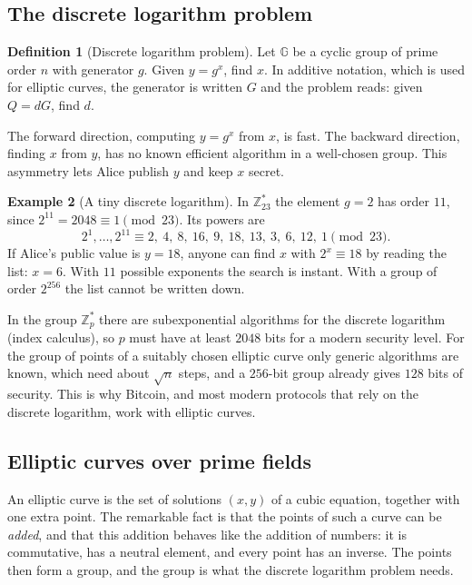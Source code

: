 \documentclass[11pt,a4paper]{article}
\theoremstyle{definition}
\newtheorem{definition}{Definition}[section]
\newtheorem{example}[definition]{Example}
\newcommand{\Z}{\mathbb{Z}}
\begin{document}
\subsection{The discrete logarithm problem}

\begin{definition}[Discrete logarithm problem]
Let $\mathbb{G}$ be a cyclic group of prime order $n$ with generator $g$. Given $y=g^x$, find $x$. In additive notation, which is used for elliptic curves, the generator is written $G$ and the problem reads: given $Q=dG$, find $d$.
\end{definition}

The forward direction, computing $y=g^x$ from $x$, is fast. The backward direction, finding $x$ from $y$, has no known efficient algorithm in a well-chosen group. This asymmetry lets Alice publish $y$ and keep $x$ secret.

\begin{example}[A tiny discrete logarithm]\label{ex:dlp}
In $\Z_{23}^*$ the element $g=2$ has order $11$, since $2^{11}=2048\equiv 1 \pmod{23}$. Its powers are
\[
2^1,\dots,2^{11} \equiv 2,\ 4,\ 8,\ 16,\ 9,\ 18,\ 13,\ 3,\ 6,\ 12,\ 1 \pmod{23}.
\]
If Alice's public value is $y=18$, anyone can find $x$ with $2^x\equiv 18$ by reading the list: $x=6$. With $11$ possible exponents the search is instant. With a group of order $2^{256}$ the list cannot be written down.
\end{example}

In the group $\Z_p^*$ there are subexponential algorithms for the discrete logarithm (index calculus), so $p$ must have at least $2048$ bits for a modern security level. For the group of points of a suitably chosen elliptic curve only generic algorithms are known, which need about $\sqrt{n}$ steps, and a $256$-bit group already gives $128$ bits of security. This is why Bitcoin, and most modern protocols that rely on the discrete logarithm, work with elliptic curves.

\subsection{Elliptic curves over prime fields}

An elliptic curve is the set of solutions $(x,y)$ of a cubic equation, together with one extra point. The remarkable fact is that the points of such a curve can be \emph{added}, and that this addition behaves like the addition of numbers: it is commutative, has a neutral element, and every point has an inverse. The points then form a group, and the group is what the discrete logarithm problem needs.
\end{document}
